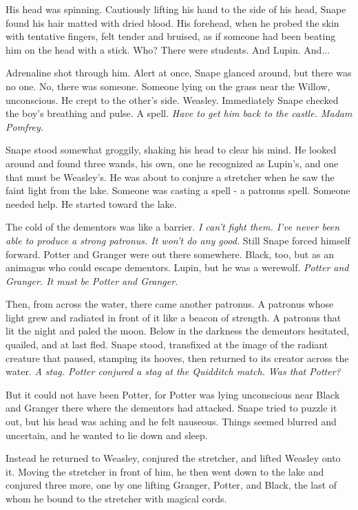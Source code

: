 \documentclass[a4paper,11pt]{article}
\begin{document}
His head was spinning. Cautiously lifting his hand to the side of his head, Snape found his hair matted with dried blood. His forehead, when he probed the skin with tentative fingers, felt tender and bruised, as if someone had been beating him on the head with a stick. Who? There were students. And Lupin. And...

Adrenaline shot through him. Alert at once, Snape glanced around, but there was no one. No, there was someone. Someone lying on the grass near the Willow, unconscious. He crept to the other's side. Weasley. Immediately Snape checked the boy's breathing and pulse. A spell. \emph{Have to get him back to the castle. Madam Pomfrey.}

Snape stood somewhat groggily, shaking his head to clear his mind. He looked around and found three wands, his own, one he recognized as Lupin's, and one that must be Weasley's. He was about to conjure a stretcher when he saw the faint light from the lake. Someone was casting a spell - a patronus spell. Someone needed help. He started toward the lake.

The cold of the dementors was like a barrier. \emph{I can't fight them. I've never been able to produce a strong patronus. It won't do any good.} Still Snape forced himself forward. Potter and Granger were out there somewhere. Black, too, but as an animagus who could escape dementors. Lupin, but he was a werewolf. \emph{Potter and Granger. It must be Potter and Granger.}

Then, from across the water, there came another patronus. A patronus whose light grew and radiated in front of it like a beacon of strength. A patronus that lit the night and paled the moon. Below in the darkness the dementors hesitated, quailed, and at last fled. Snape stood, transfixed at the image of the radiant creature that paused, stamping its hooves, then returned to its creator across the water. \emph{A stag. Potter conjured a stag at the Quidditch match. Was that Potter?}

But it could not have been Potter, for Potter was lying unconscious near Black and Granger there where the dementors had attacked. Snape tried to puzzle it out, but his head was aching and he felt nauseous. Things seemed blurred and uncertain, and he wanted to lie down and sleep.

Instead he returned to Weasley, conjured the stretcher, and lifted Weasley onto it. Moving the stretcher in front of him, he then went down to the lake and conjured three more, one by one lifting Granger, Potter, and Black, the last of whom he bound to the stretcher with magical cords.
\end{document}
